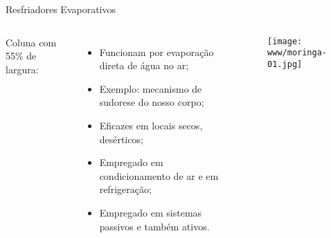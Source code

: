     \begin{frame}{Resfriadores Evaporativos}\vspace*{-0em}
        \begin{columns}
            Coluna com 55\% de largura:\\[\smallskipamount]
            \begin{itemize}
                \item<1-> Funcionam por \alert{evaporação direta} de \alert{água} no ar;
                \item<2-> Exemplo: mecanismo de \alert{sudorese} do nosso corpo;
                \item<3-> Eficazes em locais \alert{secos}, \alert{desérticos};
                \item<4-> Empregado em \alert{condicionamento de ar} e em \alert{refrigeração};
                \item<5-> Empregado em sistemas \alert{passivos} e também \alert{ativos}.
            \end{itemize}
            \begin{center}
                \begin{figure}
                    \texttt{[image: www/moringa-01.jpg]}
                \end{figure}
            \end{center}
        \end{columns}
    \end{frame}
    \begin{frame}\vspace*{-0em}
    \end{frame}
    \begin{frame}\vspace*{-0em}
    \end{frame}
    \begin{frame}\vspace*{-0em}
    \end{frame}
